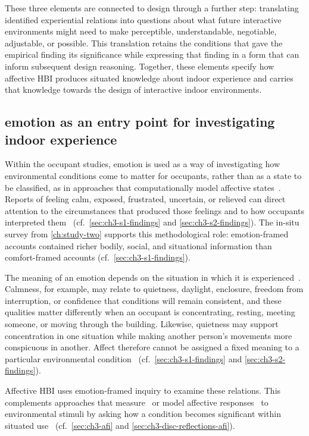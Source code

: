 These three elements are connected to design through a further step: translating identified experiential relations into questions about what future interactive environments might need to make perceptible, understandable, negotiable, adjustable, or possible. This translation retains the conditions that gave the empirical finding its significance while expressing that finding in a form that can inform subsequent design reasoning. Together, these elements specify how affective HBI produces situated knowledge about indoor experience and carries that knowledge towards the design of interactive indoor environments.


\subsection{emotion as an entry point for investigating indoor experience}
\label{subsec:emotion-entry-point}

Within the occupant studies, emotion is used as a way of investigating how environmental conditions come to matter for occupants, rather than as a state to be classified, as in approaches that computationally model affective states~\cite{picard1999affective, gao2020n}.  Reports of feeling calm, exposed, frustrated, uncertain, or relieved can direct attention to the circumstances that produced those feelings and to how occupants interpreted them~\cite{boehner2007emotion,lottridge2011affective} (cf.~\autoref{sec:ch3-s1-findings} and \autoref{sec:ch3-s2-findings}). The in-situ survey from \autoref{ch:study-two} supports this methodological role: emotion-framed accounts contained richer bodily, social, and situational information than comfort-framed accounts (cf.~\autoref{sec:ch3-s1-findings}).

The meaning of an emotion depends on the situation in which it is experienced~\cite{barrett2022context}. Calmness, for example, may relate to quietness, daylight, enclosure, freedom from interruption, or confidence that conditions will remain consistent, and these qualities matter differently when an occupant is concentrating, resting, meeting someone, or moving through the building. Likewise, quietness may support concentration in one situation while making another person's movements more conspicuous in another. Affect therefore cannot be assigned a fixed meaning to a particular environmental condition~\cite{barrett2022context,boehner2007emotion} (cf.~\autoref{sec:ch3-s1-findings} and \autoref{sec:ch3-s2-findings}).

Affective HBI uses emotion-framed inquiry to examine these relations. This complements approaches that measure~\cite{mehrabian1974approach,russell1980circumplex,bower2019impact} or model affective responses~\cite{picard1999affective,gao2020n} to environmental stimuli by asking how a condition becomes significant within situated use~\cite{boehner2005affect,boehner2007emotion,lottridge2011affective} (cf.~\autoref{sec:ch3-afi} and \autoref{sec:ch3-disc-reflections-afi}).


